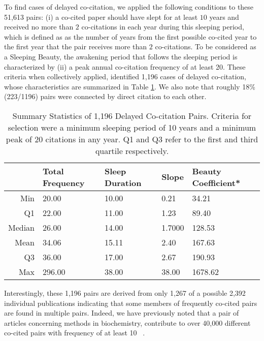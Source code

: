 \documentclass[utf8]{frontiersSCNS}
\newcommand\Tstrut{\rule{0pt}{2.9ex}} %
\begin{document}
To find cases of delayed co-citation, we applied the following conditions to these 51,613 pairs: (i)  a co-cited paper should have slept for at least $10$ years and received no more than $2$ co-citations in each year during this sleeping period, which is defined as as the number of years from the first possible co-cited year to the first year that the pair receives more than $2$ co-citations. To be considered as a Sleeping Beauty, the awakening period that follows the sleeping period is characterized by (ii) a peak annual co-citation frequency of at least 20. These criteria when collectively applied, identified 1,196 cases of delayed co-citation, whose characteristics are summarized in Table \ref{tab:table2}. We also note that roughly 18\% (223/1196) pairs were connected by direct citation to each other.

\begin{table}[ht]
\caption{Summary Statistics of 1,196 Delayed Co-citation Pairs. Criteria for selection were a minimum sleeping period of 10 years and a minimum peak of 20 citations in any year. Q1 and Q3 refer to the first and third quartile respectively.}%
\centering %
\begin{center}
\begin{tabular}{rllll} 
& Total Frequency & Sleep Duration & Slope & Beauty Coefficient* \\
\hline %
Min &  20.00 & 10.00 & 0.21 & 34.21   \Tstrut\\ 
Q1  &  22.00 & 11.00  & 1.23 & 89.40   \\ 
Median & 26.00 & 14.00 & 1.7000 & 128.53   \\ 
Mean & 34.06 & 15.11 & 2.40 & 167.63   \\ 
Q3 & 36.00 & 17.00 & 2.67 & 190.93   \\ 
Max & 296.00 & 38.00  & 38.00  & 1678.62   \\ 
\hline
\end{tabular}
\end{center}
\label{tab:table2} %
\end{table}

Interestingly, these 1,196 pairs are derived from only 1,267 of a possible 2,392 individual publications indicating that some members of frequently co-cited pairs are found in multiple pairs. Indeed, we have previously noted that a pair of articles concerning methods in biochemistry, contribute to over 40,000 different co-cited pairs with frequency of at least 10 ~\citep{devarakonda_2020}.  
\end{document}

